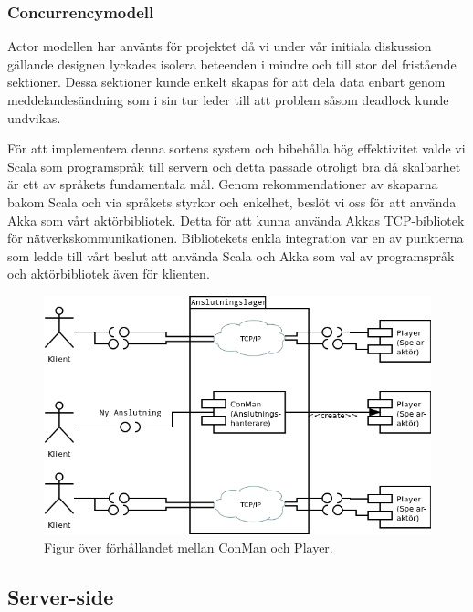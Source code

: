 \documentclass[a4paper]{article}
\begin{document}
\subsubsection{Concurrencymodell}
Actor modellen har använts för projektet då vi under vår initiala diskussion gällande designen lyckades isolera beteenden i mindre och till stor del 
fristående sektioner. Dessa sektioner kunde enkelt skapas för att dela data enbart genom meddelandesändning som i sin tur leder till att problem 
såsom deadlock kunde undvikas. 

För att implementera denna sortens system och bibehålla hög effektivitet valde vi Scala som programspråk till servern och detta passade otroligt bra då skalbarhet är ett av språkets fundamentala mål. Genom rekommendationer av skaparna bakom Scala och via språkets styrkor och enkelhet, beslöt vi oss för 
att använda Akka som vårt aktörbibliotek. Detta för att kunna använda Akkas TCP-bibliotek för nätverkskommunikationen. Bibliotekets enkla integration 
var en av punkterna som ledde till vårt beslut att använda Scala och Akka som val av programspråk och aktörbibliotek även för klienten.                    

\begin{figure}[hbt]
\centering
\includegraphics[width=1.0\textwidth]{serverActorModel2-1}
\caption{\label{fig:ConManPlayer}Figur över förhållandet mellan ConMan och Player.}
\end{figure}
\subsection{Server-side}
\end{document}
